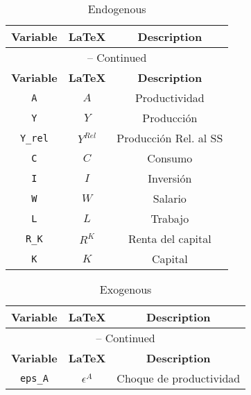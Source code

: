 \begin{center}
\begin{longtable}{ccc}
\caption{Endogenous}\\%
\hline%
\multicolumn{1}{c}{\textbf{Variable}} &
\multicolumn{1}{c}{\textbf{\LaTeX}} &
\multicolumn{1}{c}{\textbf{Description}}\\%
\hline\hline%
\endfirsthead
\multicolumn{3}{c}{{\tablename} \thetable{} -- Continued}\\%
\hline%
\multicolumn{1}{c}{\textbf{Variable}} &
\multicolumn{1}{c}{\textbf{\LaTeX}} &
\multicolumn{1}{c}{\textbf{Description}}\\%
\hline\hline%
\endhead
\texttt{A} & $A$ & Productividad\\
\texttt{Y} & $Y$ & Producción\\
\texttt{Y\_rel} & $Y^{Rel}$ & Producción Rel. al SS\\
\texttt{C} & $C$ & Consumo\\
\texttt{I} & $I$ & Inversión\\
\texttt{W} & $W$ & Salario\\
\texttt{L} & $L$ & Trabajo\\
\texttt{R\_K} & $R^{K}$ & Renta del capital\\
\texttt{K} & $K$ & Capital\\
\hline%
\end{longtable}
\end{center}
\begin{center}
\begin{longtable}{ccc}
\caption{Exogenous}\\%
\hline%
\multicolumn{1}{c}{\textbf{Variable}} &
\multicolumn{1}{c}{\textbf{\LaTeX}} &
\multicolumn{1}{c}{\textbf{Description}}\\%
\hline\hline%
\endfirsthead
\multicolumn{3}{c}{{\tablename} \thetable{} -- Continued}\\%
\hline%
\multicolumn{1}{c}{\textbf{Variable}} &
\multicolumn{1}{c}{\textbf{\LaTeX}} &
\multicolumn{1}{c}{\textbf{Description}}\\%
\hline\hline%
\endhead
\texttt{eps\_A} & $\epsilon^{A}$ & Choque de productividad\\
\hline%
\end{longtable}
\end{center}
